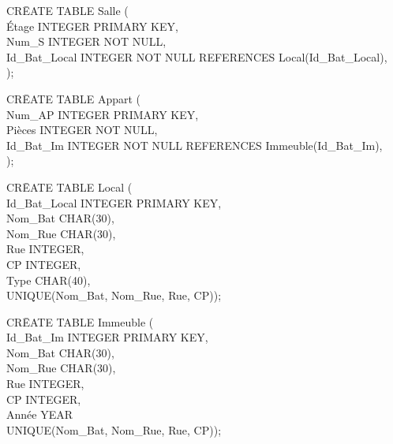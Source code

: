 \documentclass[a4paper,10.5pt]{report}
\begin{document}
		\begin{tabbing}
			CR\=EATE TABLE Salle (\\
			\> Étage INTEGER PRIMARY KEY,\\
			\> Num\_S INTEGER NOT NULL,\\
			\> Id\_Bat\_Local INTEGER NOT NULL REFERENCES Local(Id\_Bat\_Local),\\);
		\end{tabbing}

		\begin{tabbing}
			CR\=EATE TABLE Appart (\\
			\> Num\_AP INTEGER PRIMARY KEY,\\
			\> Pièces INTEGER NOT NULL,\\
			\> Id\_Bat\_Im INTEGER NOT NULL REFERENCES Immeuble(Id\_Bat\_Im),\\);
		\end{tabbing}
                                                   
		\begin{tabbing}
			CR\=EATE TABLE Local (\\
			\> Id\_Bat\_Local INTEGER PRIMARY KEY,\\
			\> Nom\_Bat CHAR(30),\\
			\> Nom\_Rue CHAR(30),\\
			\> Rue INTEGER,\\
			\> CP INTEGER,\\
			\> Type CHAR(40),\\
			\> UNIQUE(Nom\_Bat, Nom\_Rue, Rue, CP));
		\end{tabbing}
		\begin{tabbing}
			CR\=EATE TABLE Immeuble (\\
			\> Id\_Bat\_Im INTEGER PRIMARY KEY,\\
			\> Nom\_Bat CHAR(30),\\
			\> Nom\_Rue CHAR(30),\\
			\> Rue INTEGER,\\
			\> CP INTEGER,\\
			\> Année YEAR\\
			\> UNIQUE(Nom\_Bat, Nom\_Rue, Rue, CP));
		\end{tabbing}
\end{document}
